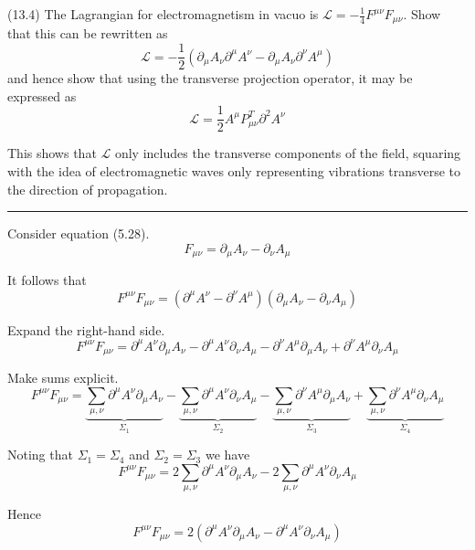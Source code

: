 \documentclass[12pt]{article}
\begin{document}
(13.4)
The Lagrangian for electromagnetism in vacuo is
$\mathcal L=-\frac{1}{4}F^{\mu\nu}F_{\mu\nu}$.
Show that this can be rewritten as
\begin{equation*}
\mathcal L=-\frac{1}{2}
\left(\partial_\mu A_\nu\partial^\mu A^\nu
-\partial_\mu A_\nu\partial^\nu A^\mu\right)
\tag{13.42}
\end{equation*}
and hence show that using the transverse projection
operator, it may be expressed as
\begin{equation*}
\mathcal L=\frac{1}{2}A^\mu P_{\mu\nu}^T\partial^2A^\nu
\tag{13.43}
\end{equation*}

This shows that $\mathcal L$ only includes the transverse
components of the field, squaring with the idea of
electromagnetic waves only representing vibrations
transverse to the direction of propagation.

\bigskip
\hrule

\bigskip
Consider equation (5.28).
\begin{equation*}
F_{\mu\nu}=\partial_\mu A_\nu-\partial_\nu A_\mu
\tag{5.28}
\end{equation*}

It follows that
\begin{equation*}
F^{\mu\nu}F_{\mu\nu}=(\partial^\mu A^\nu-\partial^\nu A^\mu)(\partial_\mu A_\nu-\partial_\nu A_\mu)
\end{equation*}

Expand the right-hand side.
\begin{equation*}
F^{\mu\nu}F_{\mu\nu}
=\partial^\mu A^\nu\partial_\mu A_\nu
-\partial^\mu A^\nu\partial_\nu A_\mu
-\partial^\nu A^\mu\partial_\mu A_\nu
+\partial^\nu A^\mu\partial_\nu A_\mu
\end{equation*}

Make sums explicit.
\begin{equation*}
F^{\mu\nu}F_{\mu\nu}
=\underbrace{\sum_{\mu,\nu}\partial^\mu A^\nu\partial_\mu A_\nu}_{\Sigma_1}
-\underbrace{\sum_{\mu,\nu}\partial^\mu A^\nu\partial_\nu A_\mu}_{\Sigma_2}
-\underbrace{\sum_{\mu,\nu}\partial^\nu A^\mu\partial_\mu A_\nu}_{\Sigma_3}
+\underbrace{\sum_{\mu,\nu}\partial^\nu A^\mu\partial_\nu A_\mu}_{\Sigma_4}
\end{equation*}

Noting that $\Sigma_1=\Sigma_4$ and $\Sigma_2=\Sigma_3$ we have
\begin{equation*}
F^{\mu\nu}F_{\mu\nu}
=2\sum_{\mu,\nu}\partial^\mu A^\nu\partial_\mu A_\nu
-2\sum_{\mu,\nu}\partial^\mu A^\nu\partial_\nu A_\mu
\end{equation*}

Hence
\begin{equation*}
F^{\mu\nu}F_{\mu\nu}
=2\left(\partial^\mu A^\nu\partial_\mu A_\nu-\partial^\mu A^\nu\partial_\nu A_\mu\right)
\end{equation*}

\end{document}
